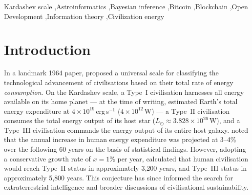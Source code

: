 \documentclass[final,5p,times,twocolumn,authoryear]{elsarticle}
\begin{document}
\begin{frontmatter}
\begin{abstract}
state variable is dimensionally incomplete as a measure of
civilisational advancement. To resolve the Conundrum, we propose the
\textit{Kardashev--Sagan--Nakamoto} (KSN) model, constructed by
renormalising the energy production ordinate by the annual average
Bitcoin network hashrate $\mathcal{H}(t)$, yielding the KSN state variable
$\mathscr{B}(t) \;=\; P(t)/\mathcal{H}(t)$ in
units of J\,Hash$^{-1}$ --- the KarNak unit. 
Any subsequent model fitted to $\mathscr{B}(t)$ carries the same parameter count as the corresponding model fitted to $P(t)$; the variable transformation itself consumes no degrees of freedom and is motivated by the Landauer
limit connecting energy to irreversible computation, and fulfils the
original requirement that the Kardashev scale be sensitive to the
information richness of a civilisation. The KSN variable spans 14
orders of magnitude over 2009--2024, reflecting the dramatic
improvement in the energy efficiency of Bitcoin proof-of-work
computation; a formal functional fit to $\mathscr{B}(t)$ is deferred to a
future work. We further discuss the implications of the KSN model for
open astronomy development via decentralised blockchain protocols, and
propose the KarNak unit as a universal information-energy yardstick
for the Kardashev scale.
\end{abstract}
 


\begin{keyword}
   Kardashev scale \sep Astroinformatics \sep Bayesian inference \sep Bitcoin
\sep Blockchain \sep Open Development \sep Information theory \sep Civilization energy
\end{keyword}
\end{frontmatter}


\section{Introduction}
\label{sec:intro}
%
In a landmark 1964 paper, \citet{kar64} proposed a universal scale
for classifying the technological advancement of civilisations based
on their total rate of energy \emph{consumption}. On the Kardashev
scale, a Type~I civilisation harnesses all energy available on its
home planet --- at the time of writing, \citet{kar64} estimated
Earth's total energy expenditure at $4 \times 10^{19}$\,erg\,s$^{-1}$
($4 \times 10^{12}$\,W) --- a Type~II civilisation consumes the total
energy output of its host star ($L_\odot \approx 3.828 \times
10^{26}$\,W), and a Type~III civilisation commands the energy output
of its entire host galaxy. \citet{kar64} noted that the annual
increase in human energy expenditure was projected at 3--4\% 
over the following 60 years \citep{Putnam1948} on the basis 
of statistical findings. However,
adopting a conservative growth rate of $x = 1\%$ per year,
\citet{kar64} calculated that human civilisation would reach Type~II
status in approximately 3{,}200 years, and Type~III status in
approximately 5{,}800 years. This conjecture has since informed the
search for extraterrestrial intelligence \citep{gray2020} and broader
discussions of civilisational sustainability.
\end{document}
